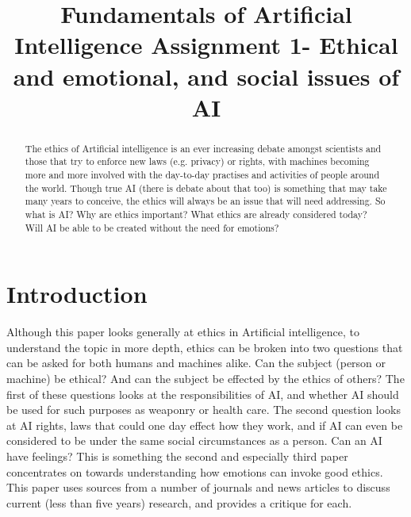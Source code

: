 \documentclass[article]{IEEEtran}
\begin{document}
\title{Fundamentals of Artificial Intelligence Assignment 1- Ethical and emotional, and social issues of AI}

\author{
}

\maketitle

\begin{abstract}
The ethics of Artificial intelligence is an ever increasing debate amongst scientists and those that try to enforce new laws (e.g. privacy) or rights, with machines becoming more and more involved with the day-to-day practises and activities of people around the world. Though true AI (there is debate about that too) is something that may take many years to conceive, the ethics will always be an issue that will need addressing. So what is AI? Why are ethics important? What ethics are already considered today? Will AI be able to be created without the need for emotions?
\end{abstract}

\section{Introduction}
Although this paper looks generally at ethics in Artificial intelligence, to understand the topic in more depth, ethics can be broken into two questions that can be asked for both humans and machines alike. Can the subject (person or machine) be ethical? And can the subject be effected by the ethics of others? The first of these questions looks at the responsibilities of AI, and whether AI should be used for such purposes as weaponry or health care. The second question looks at AI rights, laws that could one day effect how they work, and if AI can even be considered to be under the same social circumstances as a person. Can an AI have feelings? This is something the second and especially third paper concentrates on towards understanding how emotions can invoke good ethics. This paper uses sources from a number of journals and news articles to discuss current (less than five years) research, and provides a critique for each.
\end{document}
